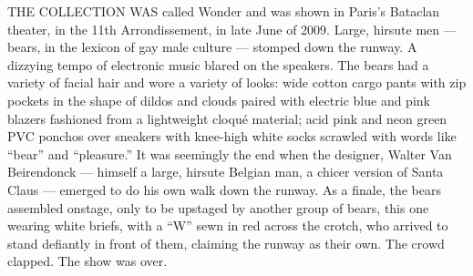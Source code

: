 THE COLLECTION WAS called Wonder and was shown in Paris's Bataclan
theater, in the 11th Arrondissement, in late June of 2009. Large,
hirsute men --- bears, in the lexicon of gay male culture --- stomped
down the runway. A dizzying tempo of electronic music blared on the
speakers. The bears had a variety of facial hair and wore a variety of
looks: wide cotton cargo pants with zip pockets in the shape of dildos
and clouds paired with electric blue and pink blazers fashioned from a
lightweight cloqué material; acid pink and neon green PVC ponchos over
sneakers with knee-high white socks scrawled with words like ``bear''
and ``pleasure.'' It was seemingly the end when the designer, Walter Van
Beirendonck --- himself a large, hirsute Belgian man, a chicer version
of Santa Claus --- emerged to do his own walk down the runway. As a
finale, the bears assembled onstage, only to be upstaged by another
group of bears, this one wearing white briefs, with a ``W'' sewn in red
across the crotch, who arrived to stand defiantly in front of them,
claiming the runway as their own. The crowd clapped. The show was over.

